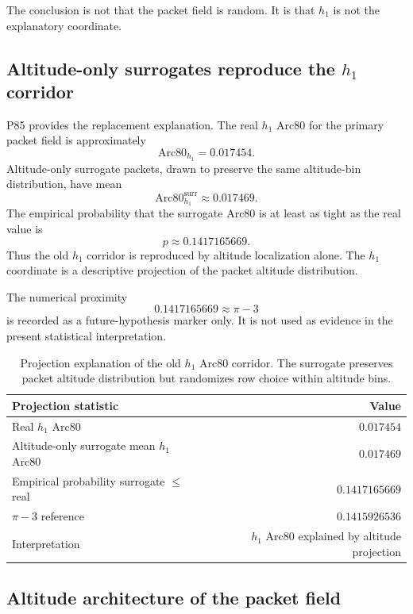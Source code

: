 \documentclass[11pt]{article}
\newcommand{\projectionp}{0.1417165669}
\newcommand{\piminusthree}{0.1415926536}
\begin{document}
The conclusion is not that the packet field is random. It is that \(h_1\) is not the explanatory coordinate.

\subsection{Altitude-only surrogates reproduce the \texorpdfstring{\(h_1\)}{h1} corridor}

P85 provides the replacement explanation. The real \(h_1\) Arc80 for the primary packet field is approximately
\[
\mathrm{Arc80}_{h_1}=0.017454.
\]
Altitude-only surrogate packets, drawn to preserve the same altitude-bin distribution, have mean
\[
\mathrm{Arc80}_{h_1}^{\mathrm{surr}}\approx 0.017469.
\]
The empirical probability that the surrogate Arc80 is at least as tight as the real value is
\[
p\approx \projectionp.
\]
Thus the old \(h_1\) corridor is reproduced by altitude localization alone. The \(h_1\) coordinate is a descriptive projection of the packet altitude distribution.

The numerical proximity
\[
\projectionp \approx \pi-3
\]
is recorded as a future-hypothesis marker only. It is not used as evidence in the present statistical interpretation.

\begin{table}[H]
\centering
\small
\begin{tabular}{lr}
\toprule
\textbf{Projection statistic} & \textbf{Value} \\
\midrule
Real \(h_1\) Arc80 & \(0.017454\) \\
Altitude-only surrogate mean \(h_1\) Arc80 & \(0.017469\) \\
Empirical probability surrogate \(\le\) real & \(\projectionp\) \\
\(\pi-3\) reference & \(\piminusthree\) \\
Interpretation & \(h_1\) Arc80 explained by altitude projection \\
\bottomrule
\end{tabular}
\caption{Projection explanation of the old \(h_1\) Arc80 corridor. The surrogate preserves packet altitude distribution but randomizes row choice within altitude bins.}
\label{tab:h1-projection}
\end{table}

\subsection{Altitude architecture of the packet field}
\end{document}
